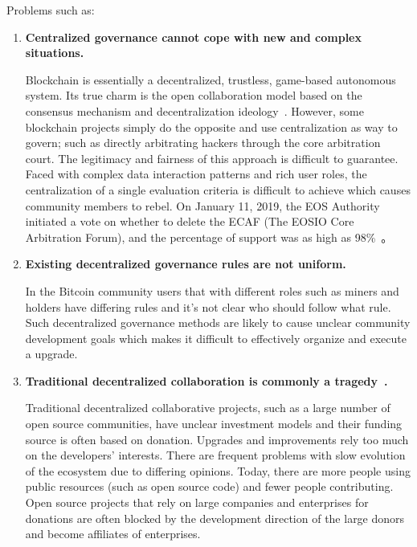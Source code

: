 Problems such as:

\begin{enumerate}
	\item 

	\textbf{Centralized governance cannot cope with new and complex situations.}

	Blockchain is essentially a decentralized, trustless, game-based autonomous system. Its true charm is the open collaboration model based on the consensus mechanism and decentralization ideology~\cite{whitepaper}. However, some blockchain projects simply do the opposite and use centralization as way to govern; such as directly arbitrating hackers through the core arbitration court. The legitimacy and fairness of this approach is difficult to guarantee. Faced with complex data interaction patterns and rich user roles, the centralization of a single evaluation criteria is difficult to achieve which causes community members to rebel. On January 11, 2019, the EOS Authority initiated a vote on whether to delete the ECAF (The EOSIO Core Arbitration Forum), and the percentage of support was as high as 98\%~\cite{DeleteECAF}。

	\item 

	\textbf{Existing decentralized governance rules are not uniform.}

	In the Bitcoin community users that with different roles such as miners and holders have differing rules and it's not clear who should follow what rule. Such decentralized governance methods are likely to cause unclear community development goals which makes it difficult to effectively organize and execute a upgrade.

	\item 

	\textbf{Traditional decentralized collaboration is commonly a tragedy~\cite{TragedyOfTheCommons}.}

	Traditional decentralized collaborative projects, such as a large number of open source communities, have unclear investment models and their funding source is often based on donation. Upgrades and improvements rely too much on the developers' interests. There are frequent problems with slow evolution of the ecosystem due to differing opinions. Today, there are more people using public resources (such as open source code) and fewer people contributing. Open source projects that rely on large companies and enterprises for donations are often blocked by the development direction of the large donors and become affiliates of enterprises.


\end{enumerate}

